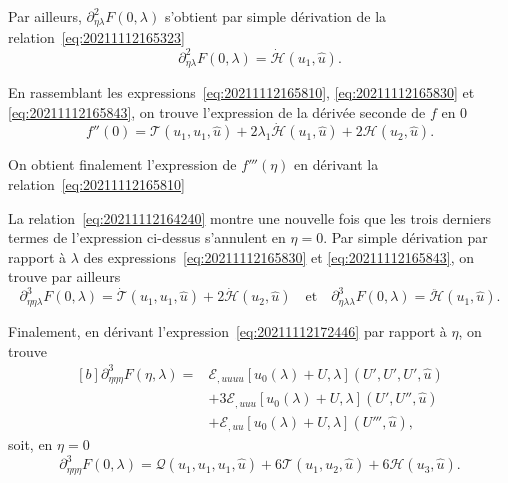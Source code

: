\documentclass[12pt, final]{amsart}
\begin{document}
Par ailleurs, \(\partial_{\eta\lambda}^2F(0, \lambda)\) s'obtient par simple
dérivation de la relation~\eqref{eq:20211112165323}
\begin{equation}
  \label{eq:20211112165843}
  \partial_{\eta\lambda}^2F(0, \lambda)=\dot{\mathcal H}(u_1, \hat{u}).
\end{equation}

En rassemblant les expressions~\eqref{eq:20211112165810},
\eqref{eq:20211112165830} et \eqref{eq:20211112165843}, on trouve l'expression
de la dérivée seconde de \(f\) en 0
\begin{equation}
  \label{eq:20211112182333}
  f''(0)=\mathcal T(u_1, u_1, \hat{u})
  +2\lambda_1\dot{\mathcal H}(u_1, \hat{u})
  +2\mathcal H(u_2, \hat{u}).
\end{equation}

On obtient finalement l'expression de \(f'''(\eta)\) en dérivant la
relation~\eqref{eq:20211112165810}

La relation~\eqref{eq:20211112164240} montre une nouvelle fois que les trois
derniers termes de l'expression ci-dessus s'annulent en \(\eta=0\). Par simple
dérivation par rapport à \(\lambda\) des expressions~\eqref{eq:20211112165830}
et \eqref{eq:20211112165843}, on trouve par ailleurs
\begin{equation}
  \label{eq:20211112173247}
  \partial_{\eta\eta\lambda}^3F(0, \lambda)
  =\dot{\mathcal T}(u_1, u_1, \hat{u})+2\dot{\mathcal H}(u_2, \hat{u})
  \quad\text{et}\quad
  \partial_{\eta\lambda\lambda}^3F(0, \lambda)
  =\ddot{\mathcal H}(u_1, \hat{u}).
\end{equation}

Finalement, en dérivant l'expression~\eqref{eq:20211112172446} par rapport à
\(\eta\), on trouve
\begin{equation}
  \begin{aligned}[b]
    \partial_{\eta\eta\eta}^3F(\eta, \lambda)={}&
    \mathcal E_{,uuuu}[u_0(\lambda)+U, \lambda](U', U', U', \hat{u})\\
    &+3\mathcal E_{,uuu}[u_0(\lambda)+U, \lambda](U', U'', \hat{u})\\
    &+\mathcal E_{,uu}[u_0(\lambda)+U, \lambda](U''', \hat{u}),
  \end{aligned}
\end{equation}
soit, en \(\eta=0\)
\begin{equation}
  \label{eq:20211112173300}
  \partial_{\eta\eta\eta}^3F(0, \lambda)=
  \mathcal Q(u_1, u_1, u_1, \hat{u})
  +6\mathcal T(u_1, u_2, \hat{u})
  +6\mathcal H(u_3, \hat{u}).
\end{equation}
\end{document}
